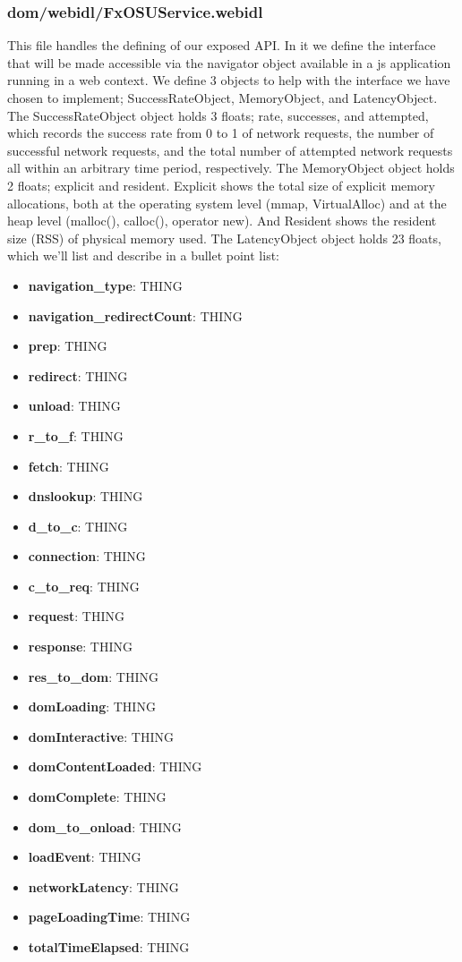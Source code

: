 \documentclass[12pt]{article}
\begin{document}
\subsubsection{dom/webidl/FxOSUService.webidl}
This file handles the defining of our exposed API. In it we define the interface that will be made accessible via the navigator object available in a js application running in a web context. We define 3 objects to help with the interface we have chosen to implement; SuccessRateObject, MemoryObject, and LatencyObject. The SuccessRateObject object holds 3 floats; rate, successes, and attempted, which records the success rate from 0 to 1 of network requests, the number of successful network requests, and the total number of attempted network requests all within an arbitrary time period, respectively. The MemoryObject object holds 2 floats; explicit and resident. Explicit shows the total size of explicit memory allocations, both at the operating system level (mmap, VirtualAlloc) and at the heap level (malloc(), calloc(), operator new). And Resident shows the resident size (RSS) of physical memory used. The LatencyObject object holds 23 floats, which we'll list and describe in a bullet point list:

\begin{itemize}
  \item \textbf{navigation\_type}: THING
  \item \textbf{navigation\_redirectCount}: THING
  \item \textbf{prep}: THING
  \item \textbf{redirect}: THING
  \item \textbf{unload}: THING
  \item \textbf{r\_to\_f}: THING
  \item \textbf{fetch}: THING
  \item \textbf{dnslookup}: THING
  \item \textbf{d\_to\_c}: THING
  \item \textbf{connection}: THING
  \item \textbf{c\_to\_req}: THING
  \item \textbf{request}: THING
  \item \textbf{response}: THING
  \item \textbf{res\_to\_dom}: THING
  \item \textbf{domLoading}: THING
  \item \textbf{domInteractive}: THING
  \item \textbf{domContentLoaded}: THING
  \item \textbf{domComplete}: THING
  \item \textbf{dom\_to\_onload}: THING
  \item \textbf{loadEvent}: THING
  \item \textbf{networkLatency}: THING
  \item \textbf{pageLoadingTime}: THING
  \item \textbf{totalTimeElapsed}: THING
\end{itemize}
\end{document}
